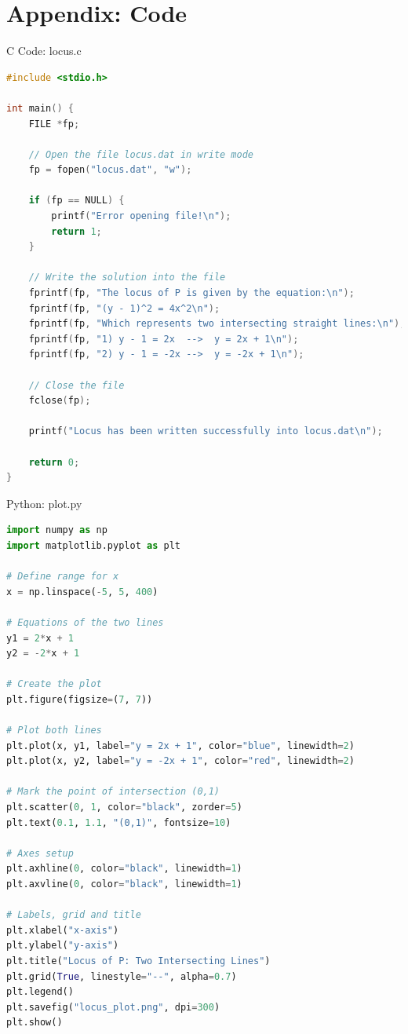 \documentclass{beamer}
\numberwithin{equation}{section}
\theoremstyle{remark}
\begin{document}
\section*{Appendix: Code}

\begin{frame}[fragile]{C Code: locus.c}
\begin{lstlisting}[language=C]
#include <stdio.h>

int main() {
    FILE *fp;

    // Open the file locus.dat in write mode
    fp = fopen("locus.dat", "w");

    if (fp == NULL) {
        printf("Error opening file!\n");
        return 1;
    }

    // Write the solution into the file
    fprintf(fp, "The locus of P is given by the equation:\n");
    fprintf(fp, "(y - 1)^2 = 4x^2\n");
    fprintf(fp, "Which represents two intersecting straight lines:\n");
    fprintf(fp, "1) y - 1 = 2x  -->  y = 2x + 1\n");
    fprintf(fp, "2) y - 1 = -2x -->  y = -2x + 1\n");

    // Close the file
    fclose(fp);

    printf("Locus has been written successfully into locus.dat\n");

    return 0;
}
\end{lstlisting}
\end{frame}

\begin{frame}[fragile]{Python: plot.py}
\begin{lstlisting}[language=Python]
 import numpy as np
import matplotlib.pyplot as plt

# Define range for x
x = np.linspace(-5, 5, 400)

# Equations of the two lines
y1 = 2*x + 1
y2 = -2*x + 1

# Create the plot
plt.figure(figsize=(7, 7))

# Plot both lines
plt.plot(x, y1, label="y = 2x + 1", color="blue", linewidth=2)
plt.plot(x, y2, label="y = -2x + 1", color="red", linewidth=2)

# Mark the point of intersection (0,1)
plt.scatter(0, 1, color="black", zorder=5)
plt.text(0.1, 1.1, "(0,1)", fontsize=10)

# Axes setup
plt.axhline(0, color="black", linewidth=1)
plt.axvline(0, color="black", linewidth=1)

# Labels, grid and title
plt.xlabel("x-axis")
plt.ylabel("y-axis")
plt.title("Locus of P: Two Intersecting Lines")
plt.grid(True, linestyle="--", alpha=0.7)
plt.legend()
plt.savefig("locus_plot.png", dpi=300)
plt.show()

\end{lstlisting}
\end{frame} 
\end{document}
